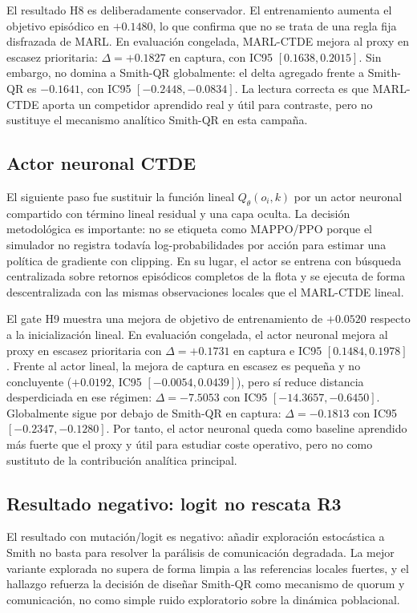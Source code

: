El resultado H8 es deliberadamente conservador. El entrenamiento aumenta el objetivo
episódico en $+0.1480$, lo que confirma que no se trata de una regla fija disfrazada de
MARL. En evaluación congelada, MARL-CTDE mejora al proxy en escasez prioritaria:
$\Delta=+0.1827$ en captura, con IC95 $[0.1638,0.2015]$. Sin embargo, no domina a
Smith-QR globalmente: el delta agregado frente a Smith-QR es $-0.1641$, con IC95
$[-0.2448,-0.0834]$. La lectura correcta es que MARL-CTDE aporta un competidor aprendido
real y útil para contraste, pero no sustituye el mecanismo analítico Smith-QR en esta
campaña.

\subsection{Actor neuronal CTDE}

El siguiente paso fue sustituir la función lineal $Q_\theta(o_i,k)$ por un actor neuronal
compartido con término lineal residual y una capa oculta. La decisión metodológica es
importante: no se etiqueta como MAPPO/PPO porque el simulador no registra todavía
log-probabilidades por acción para estimar una política de gradiente con clipping. En su
lugar, el actor se entrena con búsqueda centralizada sobre retornos episódicos completos
de la flota y se ejecuta de forma descentralizada con las mismas observaciones locales
que el MARL-CTDE lineal.

El gate H9 muestra una mejora de objetivo de entrenamiento de $+0.0520$ respecto a la
inicialización lineal. En evaluación congelada, el actor neuronal mejora al proxy en
escasez prioritaria con $\Delta=+0.1731$ en captura e IC95 $[0.1484,0.1978]$. Frente al
actor lineal, la mejora de captura en escasez es pequeña y no concluyente
($+0.0192$, IC95 $[-0.0054,0.0439]$), pero sí reduce distancia desperdiciada en ese
régimen: $\Delta=-7.5053$ con IC95 $[-14.3657,-0.6450]$. Globalmente sigue por debajo de
Smith-QR en captura: $\Delta=-0.1813$ con IC95 $[-0.2347,-0.1280]$. Por tanto, el actor
neuronal queda como baseline aprendido más fuerte que el proxy y útil para estudiar
coste operativo, pero no como sustituto de la contribución analítica principal.

\subsection{Resultado negativo: logit no rescata R3}

El resultado con mutación/logit es negativo: añadir exploración estocástica a Smith no
basta para resolver la parálisis de comunicación
degradada. La mejor variante explorada no supera de forma limpia a las referencias
locales fuertes, y el hallazgo refuerza la decisión de diseñar Smith-QR como mecanismo
de quorum y comunicación, no como simple ruido exploratorio sobre la dinámica
poblacional.

